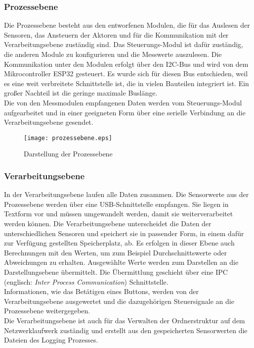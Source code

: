 \newpage
\subsubsection{Prozessebene}
Die Prozessebene besteht aus den entworfenen Modulen, die für das Auslesen der Sensoren, das Ansteuern der Aktoren und für die Kommunikation mit der Verarbeitungsebene zuständig sind. Das Steuerungs-Modul ist dafür zuständig, die anderen Module zu konfigurieren und die Messwerte auszulesen. Die Kommunikation unter den Modulen erfolgt über den I2C-Bus und wird von dem Mikrocontroller ESP32 gesteuert. Es wurde sich für diesen Bus entschieden, weil es eine weit verbreitete Schnittstelle ist, die in vielen Bauteilen integriert ist. Ein großer Nachteil ist die geringe maximale Buslänge.\\
Die von den Messmodulen empfangenen Daten werden vom Steuerungs-Modul aufgearbeitet und in einer geeigneten Form über eine serielle Verbindung an die Verarbeitungsebene gesendet.

\begin{figure}[h]
\centering
\texttt{[image: prozessebene.eps]}
\caption{Darstellung der Prozessebene}
\label{abbildung_prozessebene}
\end{figure}

\subsubsection{Verarbeitungsebene}
In der Verarbeitungsebene laufen alle Daten zusammen. Die Sensorwerte aus der Prozessebene werden über eine USB-Schnittstelle empfangen. Sie liegen in Textform vor und müssen umgewandelt werden, damit sie weiterverarbeitet werden können. Die Verarbeitungsebene unterscheidet die Daten der unterschiedlichen Sensoren und speichert sie in passender Form, in einem dafür zur Verfügung gestellten Speicherplatz, ab. Es erfolgen in dieser Ebene auch Berechnungen mit den Werten, um zum Beispiel Durchschnittswerte oder Abweichungen zu erhalten. Ausgewählte Werte werden zum Darstellen an die Darstellungsebene übermittelt. Die Übermittlung geschieht über eine IPC (englisch: \textit{Inter Process Communication}) Schnittstelle.
\\
Informationen, wie das Betätigen eines Buttons, werden von der Verarbeitungsebene ausgewertet und die dazugehörigen Steuersignale an die Prozessebene weitergegeben.
\\
Die Verarbeitungsebene ist auch für das Verwalten der Ordnerstruktur auf dem Netzwerklaufwerk zuständig und erstellt aus den gespeicherten Sensorwerten die Dateien des Logging Prozesses.

